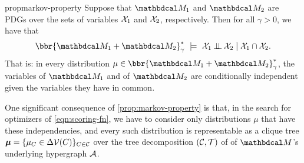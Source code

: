 \documentclass[twoside]{article}
\begin{document}
\begin{linked}{prop}{markov-property}
    Suppose that $\dg M_1$ and $\dg M_2$ are PDGs
    over the sets of variables $\mathcal X_1$ and $\mathcal X_2$, respectively.
	Then for all $\gamma > 0$, we have that
	\[
	 	\bbr{\dg M_1 \bundle \dg M_2}^*_\gamma
			~\models~
		\X_1 \mathbin{\bot\!\!\!\bot} \X_2 \mid \X_1 \cap \X_2.
	\]
	That is: in every distribution $\mu \in \bbr{\dg M_1 \bundle \dg M_2}^*_\gamma$,
    the variables of $\dg M_1$ and of $\dg M_2$ are conditionally independent given the variables they have in common.
\end{linked}

One significant consequence of \cref{prop:markov-property} is that, in the
search for optimizers of \eqref{eqn:scoring-fn}, we have to
consider only distributions $\mu$ that have these independencies,
and every such distribution is representable as
a clique tree
$\boldsymbol\mu = \{\mu_C \in \Delta\mathcal V(C) \}_{C \in \mathcal C}$
over the tree decomposition $(\cal C, T)$ of
of $\dg M$'s underlying hypergraph $\mathcal A$.
\end{document}
